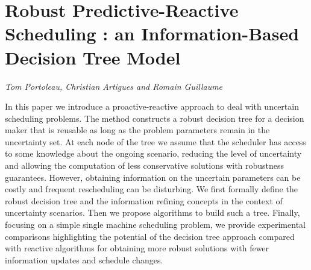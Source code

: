 \documentclass[../booklet.tex]{subfiles}
\begin{document}
\section[Robust Predictive-Reactive Scheduling : an Information-Based Decision Tree Model. {\it Tom Portoleau, Christian Artigues and Romain Guillaume}]{Robust Predictive-Reactive Scheduling : an Information-Based Decision Tree Model}
  

\begin{center}
  {\it Tom Portoleau, Christian Artigues and Romain Guillaume}
\end{center}

\vskip 0.8cm


In this paper we introduce a proactive-reactive approach to deal with uncertain scheduling problems. The method constructs a robust decision tree for a decision maker  that is reusable as long as the problem parameters remain in the uncertainty set. At each node of the tree we assume that the scheduler has access to some knowledge about the ongoing scenario, reducing the level of uncertainty and allowing the computation of less conservative solutions with robustness guarantees. However, obtaining information on the uncertain parameters can be costly and frequent rescheduling can be disturbing. 
We first formally define the robust decision tree and the information refining concepts in the context of uncertainty scenarios. Then we propose algorithms to build such a tree. Finally, focusing on a simple single machine scheduling problem, we provide experimental comparisons highlighting the potential of the decision tree approach compared with reactive algorithms for obtaining more robust solutions with fewer information updates and schedule changes.
\end{document}
